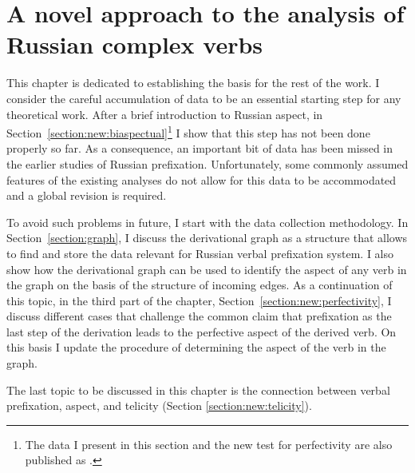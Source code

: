 
\chapter{A novel approach to the analysis of Russian complex verbs} %
\label{Chapter2}
This chapter is dedicated to establishing the basis for the rest of the work. I consider the careful accumulation of data to be an essential starting step for any theoretical work. After a brief introduction to Russian aspect, in Section~\ref{section:new:biaspectual}\footnote{The data I present in this section and the new test for perfectivity are also published as \citealt{ZinovaFilip:13, ZinovaFilip:14b}.} I show that this step has not been done properly so far. As a consequence, an important bit of data has been missed in the earlier studies of Russian prefixation. Unfortunately, some commonly assumed features of the existing analyses do not allow for this data to be accommodated and a global revision is required.
 

To avoid such problems in future, I start with the data collection methodology.
In Section~\ref{section:graph}, I discuss the derivational graph as a structure that allows to find and store the data relevant for Russian verbal prefixation system. I also show how the derivational graph can be used to identify the aspect of any verb in the graph on the basis of the structure of incoming edges. As a continuation of this topic, in the third part of the chapter, Section~\ref{section:new:perfectivity}, I discuss different cases that challenge the common claim that prefixation as the last step of the derivation leads to the perfective aspect of the derived verb. On this basis I update the procedure of determining the aspect of the verb in the graph.  

The last topic to be discussed in this chapter is the connection between verbal prefixation, aspect, and telicity (Section \ref{section:new:telicity}). 


